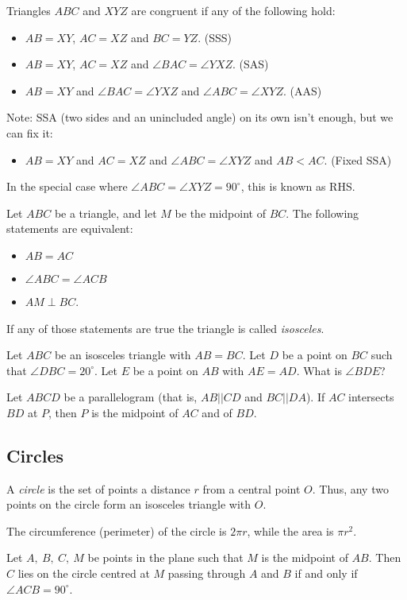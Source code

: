 Triangles $ABC$ and $XYZ$ are congruent if any of the following hold:
\begin{itemize}
  \item $AB=XY$, $AC=XZ$ and $BC=YZ$. (SSS)
  \item $AB=XY$, $AC=XZ$ and $\angle BAC=\angle YXZ$. (SAS)
  \item $AB=XY$ and $\angle BAC=\angle YXZ$ and $\angle ABC=\angle XYZ$. (AAS)
\end{itemize}
Note: SSA (two sides and an unincluded angle) on its own isn't enough, but we
can fix it:
\begin{itemize}
  \item $AB=XY$ and $AC=XZ$ and $\angle ABC=\angle XYZ$ and $AB<AC$. (Fixed SSA)
\end{itemize}
In the special case where $\angle ABC=\angle XYZ=90^\circ$, this is known as RHS.\@
\begin{result}{\label{r:b:g:c:1}}
  Let $ABC$ be a triangle, and let $M$ be the midpoint of $BC$.
  The following statements are equivalent:
  \begin{itemize}
    \item $AB=AC$
    \item $\angle ABC=\angle ACB$
    \item $AM\perp BC$.
  \end{itemize}
\end{result}
If any of those statements are true the triangle is called \emph{isosceles}.
\begin{problem}
  Let $ABC$ be an isosceles triangle with $AB=BC$. Let $D$ be a point on $BC$
  such that $\angle DBC=20^\circ$. Let $E$ be a point on $AB$ with $AE=AD$. What
  is $\angle BDE$?
\end{problem}
\begin{result}{\label{r:b:g:c:2}}
  Let $ABCD$ be a parallelogram (that is, $AB||CD$ and $BC||DA$). If $AC$
  intersects $BD$ at $P$, then $P$ is the midpoint of $AC$ and of $BD$.
\end{result}
\subsection{Circles}
A \emph{circle} is the set of points a distance $r$ from a central point $O$.
Thus, any two points on the circle form an isosceles triangle with $O$.

The circumference (perimeter) of the circle is $2\pi r$, while the area is $\pi
r^2$.
\begin{result}{\label{r:b:g:ci:1}}
  Let $A,\ B,\ C,\ M$ be points in the plane such that $M$ is the midpoint of
  $AB$. Then $C$ lies on the circle centred at $M$ passing through $A$ and $B$
  if and only if $\angle ACB=90^\circ$.
\end{result}

